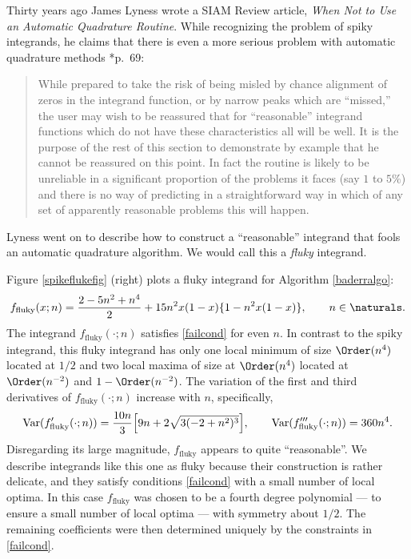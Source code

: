 \documentclass[]{article}
\DeclareMathOperator{\Var}{Var}
\theoremstyle{definition}
\theoremstyle{remark}
\begin{document}
Thirty years ago James Lyness wrote a SIAM Review article, \emph{When Not to Use an Automatic Quadrature Routine}.  While recognizing the problem of spiky integrands, he claims that there is even a more serious problem with automatic quadrature methods   \cite{Lyn83}*{p.\ 69}:
\begin{quote}
While prepared to take the risk of being misled by chance alignment of zeros in the integrand function, or by narrow peaks which are ``missed,'' the user may wish to be reassured that for ``reasonable'' integrand functions which do not have these characteristics all will be well. It is the purpose of the rest of this section to demonstrate by example that he cannot be reassured on this point. In fact the routine is likely to be unreliable in a significant proportion of the problems it faces (say $1$ to $5\%$) and there is no way of predicting in a straightforward way in which of any set of apparently reasonable problems this will happen.
\end{quote}
Lyness went on to describe how to construct a ``reasonable'' integrand that fools an automatic quadrature algorithm.  We would call this a \emph{fluky} integrand.  

Figure \ref{spikeflukefig} (right) plots a fluky integrand for Algorithm \ref{baderralgo}:
\begin{equation} \label{fluky}
f_{\text{fluky}}(x;n) = \frac{2 - 5 n^2 + n^4}{2}+ 15n^2 x(1-x)\{1 - n^2 x(1-x)\}, \qquad n \in \naturals.
\end{equation}
The integrand $f_{\text{fluky}}(\cdot;n)$ satisfies \eqref{failcond} for even $n$.   In contrast to the spiky integrand, this fluky integrand has only one local minimum of size $\Order(n^4)$ located at $1/2$ and two local maxima of size at $\Order(n^4)$ located at $\Order(n^{-2})$ and $1-\Order(n^{-2})$.  The variation of the first and third derivatives of $f_{\text{fluky}}(\cdot;n)$ increase with $n$, specifically,
\begin{equation*}
\Var(f'_{\text{fluky}}(\cdot;n))= \frac{10 n}{3}  \Bigl[9 n + 2 \sqrt{3(-2 + n^2)^3} \Bigr ], \qquad
\Var(f'''_{\text{fluky}}(\cdot;n))= 360n^4.
\end{equation*}
Disregarding its large magnitude, $f_{\text{fluky}}$ appears to quite ``reasonable''.  We describe integrands like this one as fluky because their construction is rather delicate, and they satisfy conditions \eqref{failcond} with a small number of local optima.  In this case $f_{\text{fluky}}$ was chosen to be a fourth degree polynomial --- to ensure a small number of local optima --- with symmetry about $1/2$.  The remaining coefficients were then determined uniquely by the constraints in \eqref{failcond}.  
\end{document}
